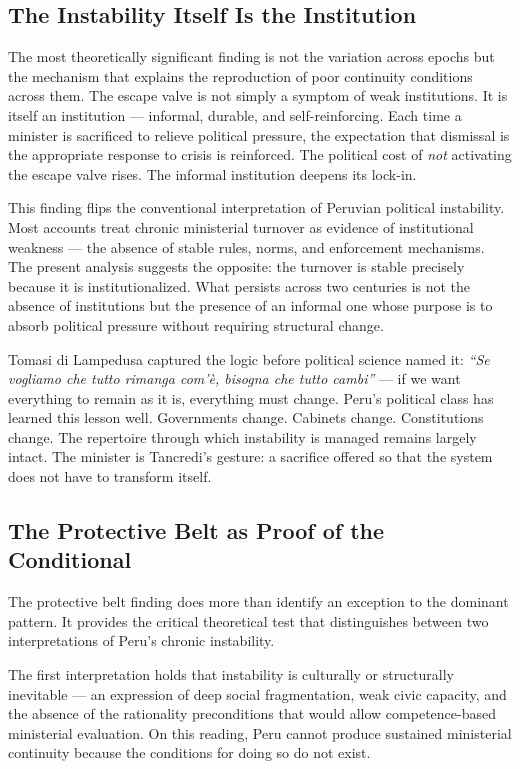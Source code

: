 \documentclass[doc, 12pt, a4paper,floatsintext]{apa7}
\begin{document}
\subsection{The Instability Itself Is the Institution}

The most theoretically significant finding is not the variation 
across epochs but the mechanism that explains the reproduction of 
poor continuity conditions across them. The escape valve is not 
simply a symptom of weak institutions. It is itself an institution 
--- informal, durable, and self-reinforcing. Each time a minister 
is sacrificed to relieve political pressure, the expectation that 
dismissal is the appropriate response to crisis is reinforced. 
The political cost of \emph{not} activating the escape valve rises. 
The informal institution deepens its lock-in.

This finding flips the conventional interpretation of Peruvian 
political instability. Most accounts treat chronic ministerial 
turnover as evidence of institutional weakness --- the absence of 
stable rules, norms, and enforcement mechanisms. The present 
analysis suggests the opposite: the turnover is stable precisely 
because it is institutionalized. What persists across two centuries 
is not the absence of institutions but the presence of an informal 
one whose purpose is to absorb political pressure without requiring 
structural change.

Tomasi di Lampedusa captured the logic before political science 
named it: \textit{``Se vogliamo che tutto rimanga com'è, bisogna 
che tutto cambi''} --- if we want everything to remain as it is, 
everything must change. Peru's political class has learned this 
lesson well. Governments change. Cabinets change. Constitutions 
change. The repertoire through which instability is managed 
remains largely intact. The minister is Tancredi's gesture: a 
sacrifice offered so that the system does not have to transform 
itself.

\subsection{The Protective Belt as Proof of the Conditional}

The protective belt finding does more than identify an exception 
to the dominant pattern. It provides the critical theoretical test 
that distinguishes between two interpretations of Peru's chronic 
instability.

The first interpretation holds that instability is culturally or 
structurally inevitable --- an expression of deep social 
fragmentation, weak civic capacity, and the absence of the 
rationality preconditions that would allow competence-based 
ministerial evaluation. On this reading, Peru cannot produce 
sustained ministerial continuity because the conditions for doing 
so do not exist.
\end{document}
